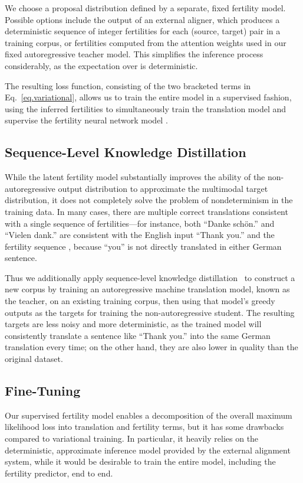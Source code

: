 \documentclass{article} \usepackage{iclr2018_conference,times}
\begin{document}
We choose a proposal distribution  defined by a separate, fixed fertility model. Possible options include the output of an external aligner, which produces a deterministic sequence of integer fertilities for each (source, target) pair in a training corpus, or fertilities computed from the attention weights used in our fixed autoregressive teacher model. This simplifies the inference process considerably, as the expectation over  is deterministic.

The resulting loss function, consisting of the two bracketed terms in Eq.~\ref{eq.variational}, allows us to train the entire model in a supervised fashion, using the inferred fertilities to simultaneously train the translation model  and supervise the fertility neural network model .

\subsection{Sequence-Level Knowledge Distillation}\label{sec.seqkd}

While the latent fertility model substantially improves the ability of the non-autoregressive output distribution to approximate the multimodal target distribution, it does not completely solve the problem of nondeterminism in the training data. In many cases, there are multiple correct translations consistent with a single sequence of fertilities---for instance, both ``Danke sch\"{o}n.'' and ``Vielen dank.'' are consistent with the English input ``Thank you.'' and the fertility sequence , because ``you'' is not directly translated in either German sentence.

Thus we additionally apply sequence-level knowledge distillation~\citep{kim2016sequence} to construct a new corpus by training an autoregressive machine translation model, known as the teacher, on an existing training corpus, then using that model's greedy outputs as the targets for training the non-autoregressive student. The resulting targets are less noisy and more deterministic, as the trained model will consistently translate a sentence like ``Thank you.'' into the same German translation every time; on the other hand, they are also lower in quality than the original dataset.



\subsection{Fine-Tuning}
Our supervised fertility model enables a decomposition of the overall maximum likelihood loss into translation and fertility terms, but it has some drawbacks compared to variational training.
In particular, it heavily relies on the deterministic, approximate inference model provided by the external alignment system, while it would be desirable to train the entire model, including the fertility predictor, end to end.
\end{document}
